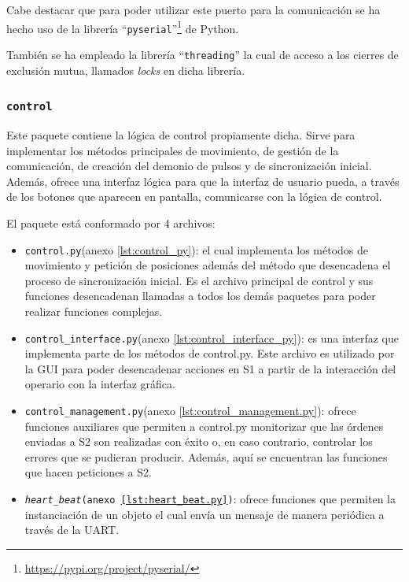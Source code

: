 Cabe destacar que para poder utilizar este puerto para la comunicación se ha hecho uso de la librería ``\texttt{pyserial}''\footnote{\url{https://pypi.org/project/pyserial/}} de Python.

También se ha empleado la librería ``\texttt{threading}'' la cual de acceso a los cierres de exclusión mutua, llamados \textit{locks} en dicha librería.

\subsubsection{\texttt{control}}

Este paquete contiene la lógica de control propiamente dicha. Sirve para implementar los métodos principales de movimiento, de gestión de la comunicación, de creación del demonio de pulsos y de  sincronización inicial. Además, ofrece una interfaz lógica para que la interfaz de usuario pueda, a través de los botones que aparecen en pantalla, comunicarse con la lógica de control.

El paquete está conformado por 4 archivos:

\begin{itemize}
    \item \texttt{control.py}(anexo \ref{lst:control_py}): el cual implementa los métodos de movimiento y petición de posiciones además del método que desencadena el proceso de sincronización inicial. Es el archivo principal de control y sus funciones desencadenan llamadas a todos los demás paquetes para poder realizar funciones complejas.
    \item \texttt{control\_interface.py}(anexo \ref{lst:control_interface_py}): es una interfaz que implementa parte de los métodos de control.py. Este archivo es utilizado por la GUI para poder desencadenar acciones en \ac{S1} a partir de la interacción del operario con la interfaz gráfica.
    \item \texttt{control\_management.py}(anexo \ref{lst:control_management.py}): ofrece funciones auxiliares que permiten a control.py monitorizar que las órdenes enviadas a \ac{S2} son realizadas con éxito o, en caso contrario, controlar los errores que se pudieran producir.
    Además, aquí se encuentran las funciones que hacen peticiones a \ac{S2}.
    \item \texttt{\textit{heart\_beat}(anexo \ref{lst:heart_beat.py})}: ofrece funciones que permiten la instanciación de un objeto el cual envía un mensaje de manera periódica a través de la UART.
\end{itemize}

